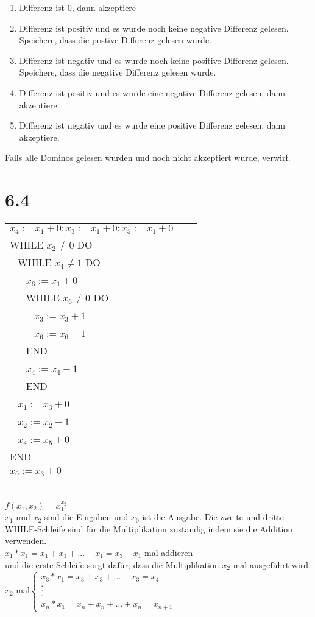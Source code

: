\documentclass{article}
\begin{document}
\begin{itemize}
	\begin{enumerate}
	\item Differenz ist 0, dann akzeptiere
	\item Differenz ist positiv und es wurde noch keine negative Differenz gelesen. Speichere, dass die postive Differenz gelesen wurde.
	\item Differenz ist negativ und es wurde noch keine positive Differenz gelesen. Speichere, dass die negative Differenz gelesen wurde.
	\item Differenz ist positiv und es wurde eine negative Differenz gelesen, dann akzeptiere. 
	\item Differenz ist negativ und es wurde eine positive Differenz gelesen, dann akzeptiere.
	\end{enumerate}
	Falls alle Dominos gelesen wurden und noch nicht akzeptiert wurde, verwirf.	
\end{itemize}

\section{6.4}


\begin{tabular}{l l r}
$x_4:=x_1+0;x_3:= x_1+0;x_5:= x_1+0$\\
WHILE $x_2 \neq 0$ DO\\
~ WHILE $x_4 \neq 1$ DO\\
~ ~ $x_6:= x_1 + 0$\\
~ ~ WHILE $x_6 \neq 0$ DO\\
~ ~ ~ $x_3:= x_3 + 1$\\
~ ~ ~ $x_6:= x_6 - 1$\\
~ ~ END\\
~ ~ $x_4:= x_4 - 1$\\
~ ~ END\\
~ $x_1:= x_3 + 0$\\
~ $x_2:= x_2 - 1$\\
~ $x_4:= x_5 + 0$\\
END\\
$x_0:= x_3 + 0$\\
\end{tabular}

~\\

$f(x_1,x_2)= x_1^{x_2}$\\

$x_1$ und $x_2$ sind die Eingaben und $x_0$ ist die Ausgabe. Die zweite und dritte WHILE-Schleife sind für die Multiplikation zuständig indem sie die Addition verwenden.\\

$x_1 * x_1 = x_1+x_1+...+x_1=x_3$  ~  $x_1$-mal addieren\\

und die erste Schleife sorgt dafür, dass die Multiplikation $x_2$-mal ausgeführt wird.\\

$x_2$-mal$\begin{cases}
 x_3*x_1=x_3+x_3+...+x_3=x_4\\
 .\\
 .\\
 .\\
 x_n*x_1=x_n+x_n+...+x_n=x_{n+1}
 \end{cases}	$
	
\end{document}

